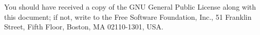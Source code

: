 \documentclass[a4paper,10pt]{book}
\newcommand{\ind}[1]{\begin{latexonly}\index{#1}\end{latexonly}}
\newcommand{\makesection}[2]{ \aname{#1}{} \section{\ahrefloc{#1}{#2}} \label{#1} }
\newcommand{\bracehack}{\def\{{\char"7B}\def\}{\char"7D}}
\newcommand{\titem}[1]{\item[\bracehack\texttt{#1}]}
\newcommand{\Jabber}{Jabber}
\newcommand{\XMPP}{XMPP}
\begin{document}
You should have received a copy of the GNU General Public License along with
this document; if not, write to the Free Software Foundation, Inc., 51 Franklin
Street, Fifth Floor, Boston, MA 02110-1301, USA.






\begin{latexonly}
\printindex
\end{latexonly}
\end{document}
